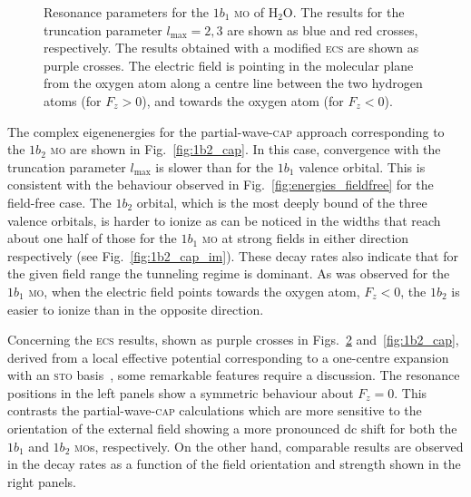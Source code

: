 \begin{figure}
\begin{subfigure}[b]{0.45\linewidth}
    \caption{}\label{fig:1b1_cap_im}
  \end{subfigure}
  \caption{Resonance parameters for the $1b_{1}$ \textsc{mo} of
    H$_{2}$O. The results for the truncation parameter
    $l_{\mathrm{max}} = 2, 3$ are shown as blue and red crosses,
    respectively. The results obtained with a modified \textsc{ecs}
    are shown as purple crosses. The electric field is pointing in the
    molecular plane from the oxygen atom along a centre line between
    the two hydrogen atoms (for $F_{z} > 0$), and towards the oxygen
    atom (for $F_{z} < 0$).}
  \label{fig:1b1_cap}
\end{figure}

The complex eigenenergies for the partial-wave-\textsc{cap} approach
corresponding to the $1b_{2}$ \textsc{mo} are shown in
Fig.~\ref{fig:1b2_cap}. In this case, convergence with the truncation
parameter $l_{\mathrm{max}}$ is slower than for the $1b_{1}$ valence
orbital. This is consistent with the behaviour observed in
Fig.~\ref{fig:energies_fieldfree} for the field-free case. The
$1b_{2}$ orbital, which is the most deeply bound of the three valence
orbitals, is harder to ionize as can be noticed in the widths that
reach about one half of those for the $1b_{1}$ \textsc{mo} at strong
fields in either direction respectively (see
Fig.~\ref{fig:1b2_cap_im}). These decay rates also indicate that for
the given field range the tunneling regime is dominant. As was
observed for the $1b_{1}$ \textsc{mo}, when the electric field points
towards the oxygen atom, $F_{z} < 0$, the $1b_{2}$ is easier to ionize
than in the opposite direction.




Concerning the \textsc{ecs} results, shown as purple crosses in
Figs.~\ref{fig:1b1_cap} and~\ref{fig:1b2_cap}, derived from a local
effective potential corresponding to a one-centre expansion with an
\textsc{sto} basis~\cite{sarias_2016}, some remarkable features
require a discussion. The resonance positions in the left panels show
a symmetric behaviour about $F_{z} = 0$. This contrasts the
partial-wave-\textsc{cap} calculations which are more sensitive to the
orientation of the external field showing a more pronounced dc shift
for both the $1b_{1}$ and $1b_{2}$ \textsc{mo}s, respectively. On the
other hand, comparable results are observed in the decay rates as a
function of the field orientation and strength shown in the right
panels.

